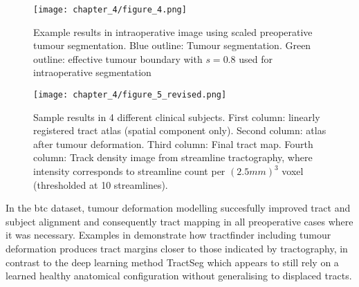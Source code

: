 \begin{figure*}[h!]
  \centering
  \texttt{[image: chapter\_4/figure\_4.png]}
  \caption{Example results in intraoperative image using scaled preoperative tumour segmentation. Blue outline: Tumour segmentation. Green outline: effective tumour boundary with $s=0.8$ used for intraoperative segmentation}
  \label{fig:shrink}
\end{figure*}

\begin{figure*}[h!]
  \centering
  \texttt{[image: chapter\_4/figure\_5\_revised.png]}
  \caption{Sample results in 4 different clinical subjects. First column: linearly registered tract atlas (spatial component only). Second column: atlas after tumour deformation. Third column: Final tract map. Fourth column: Track density image from streamline tractography, where intensity corresponds to streamline count per $(2.5mm)^3$ voxel (thresholded at 10 streamlines).}
  \label{fig:res}
\end{figure*}

In the \gls{btc} dataset, tumour deformation modelling succesfully improved tract and subject alignment and consequently tract mapping in all preoperative cases where it was necessary.
Examples in  demonstrate how tractfinder including tumour deformation produces tract margins closer to those indicated by tractography, in contrast to the deep learning method TractSeg which appears to still rely on a learned healthy anatomical configuration without generalising to displaced tracts.
